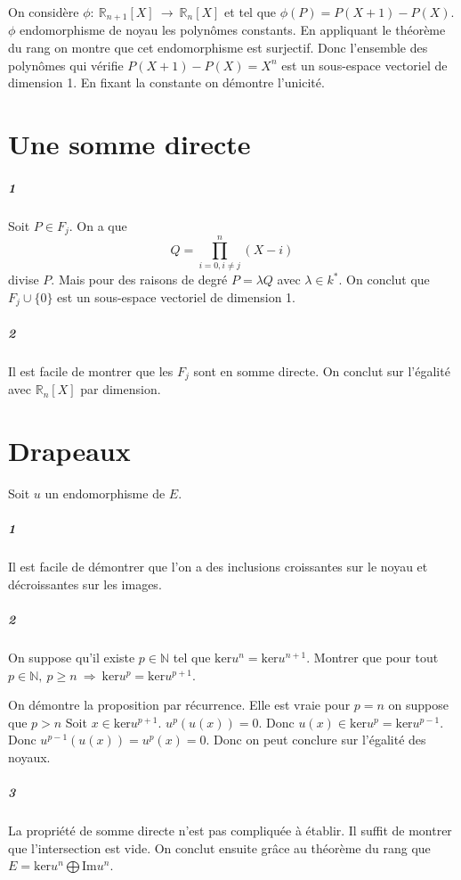 \documentclass[10pt,a4paper]{article}
\begin{document}
On considère $\phi : \ \mathbb{R}_{n+1}[X] \ \rightarrow \ \mathbb{R}_n[X]$ et tel que $\phi(P)=P(X+1)-P(X)$. $\phi$ endomorphisme de noyau les polynômes constants. En appliquant le théorème du rang on montre que cet endomorphisme est surjectif. Donc l'ensemble des polynômes qui vérifie $P(X+1)-P(X)=X^n$ est un sous-espace vectoriel de dimension 1. En fixant la constante on démontre l'unicité.

\section{Une somme directe}
\subparagraph{1}Soit $P \in F_j$. On a que $$Q=\prod_{i=0, i\neq j}^n (X-i)$$ divise $P$. Mais pour des raisons de degré $P = \lambda Q$ avec $\lambda \in k^*$. On conclut que $F_j \cup \lbrace 0 \rbrace$ est un sous-espace vectoriel de dimension 1.
\subparagraph{2}Il est facile de montrer que les $F_j$ sont en somme directe. On conclut sur l'égalité avec $\mathbb{R}_n[X]$ par dimension.

\section{Drapeaux}
Soit $u$ un endomorphisme de $E$. 
\subparagraph{1}Il est facile de démontrer que l'on a des inclusions croissantes sur le noyau et décroissantes sur les images.
\subparagraph{2}On suppose qu'il existe $p \in \mathbb{N}$ tel que $\text{ker}u^n=\text{ker}u^{n+1}$. Montrer que pour tout $p \in \mathbb{N}, \ p \ge n \ \Rightarrow \ \text{ker}u^p=\text{ker}u^{p+1}$.

On démontre la proposition par récurrence. Elle est vraie pour $p=n$ on suppose que $p>n$
Soit $x \in \text{ker} u^{p+1}$. $u^p(u(x))=0$. Donc $u(x) \in \text{ker} u^p =\text{ker} u^{p-1}$. Donc $u^{p-1}(u(x))= u^p(x)=0$. Donc on peut conclure sur l'égalité des noyaux.
\subparagraph{3}La propriété de somme directe n'est pas compliquée à établir. Il suffit de montrer que l'intersection est vide. On conclut ensuite grâce au théorème du rang que $E = \text{ker} u^n \bigoplus \text{Im} u^n$.
\end{document}
